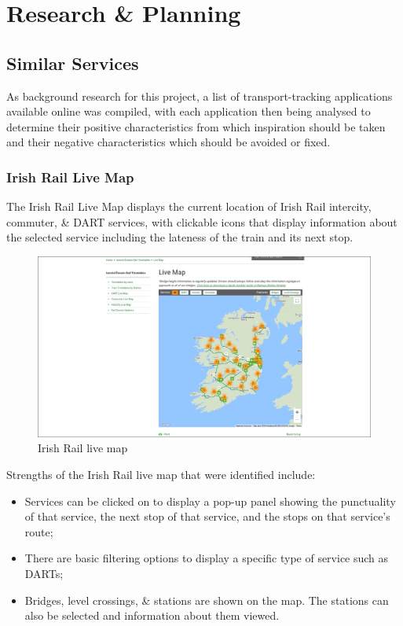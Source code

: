 \documentclass[a4paper,11pt]{report}
\begin{document}
\chapter{Research \& Planning}
\section{Similar Services}
As background research for this project, a list of transport-tracking applications available online was compiled, with each application then being analysed to determine their positive characteristics from which inspiration should be taken and their negative characteristics which should be avoided or fixed.

\subsection{Irish Rail Live Map}
The Irish Rail Live Map\supercite{liveir} displays the current location of Irish Rail intercity, commuter, \& DART services, with clickable icons that display information about the selected service including the lateness of the train and its next stop.
\begin{figure}[H]
    \centering
    \includegraphics[width=\textwidth]{../PDD/images/irlive.png}
    \caption{Irish Rail live map}
\end{figure}

Strengths of the Irish Rail live map that were identified include:
\begin{itemize}
    \item   Services can be clicked on to display a pop-up panel showing the punctuality of that service, the next stop of that service, and the stops on that service's route;
    \item   There are basic filtering options to display a specific type of service such as DARTs;
    \item   Bridges, level crossings, \& stations are shown on the map.
            The stations can also be selected and information about them viewed.
\end{itemize}
\end{document}
